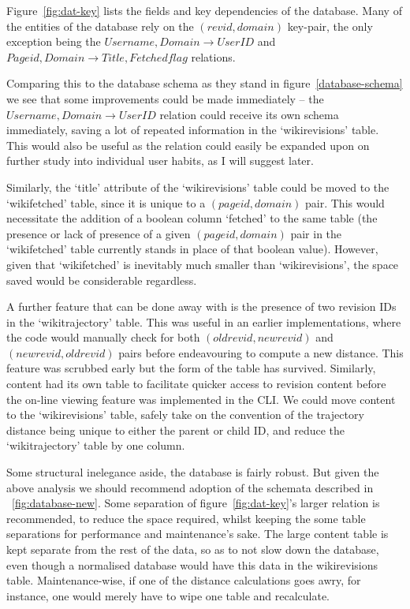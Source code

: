 Figure~\ref{fig:dat-key} lists the fields and key dependencies of the
database. Many of the entities of the database rely on the $(revid,
domain)$ key-pair, the only exception being the $Username, Domain
\rightarrow UserID$ and $Pageid, Domain \rightarrow Title, Fetched
flag$ relations.

Comparing this to the database schema as they stand in
figure~\ref{database-schema} we see that some improvements could be
made immediately -- the $Username, Domain \rightarrow UserID$ relation
could receive its own schema immediately, saving a lot of repeated
information in the `wikirevisions' table. This would also be useful as
the relation could easily be expanded upon on further study into
individual user habits, as I will suggest later.

Similarly, the `title' attribute of the `wikirevisions' table could be
moved to the `wikifetched' table, since it is unique to a
$(pageid,domain)$ pair. This would necessitate the addition of a
boolean column `fetched' to the same table (the presence or lack of
presence of a given $(pageid,domain)$ pair in the `wikifetched' table
currently stands in place of that boolean value). However, given that
`wikifetched' is inevitably much smaller than `wikirevisions', the
space saved would be considerable regardless.

A further feature that can be done away with is the presence of two
revision IDs in the `wikitrajectory' table. This was useful in an
earlier implementations, where the code would manually check for both
$(oldrevid,newrevid)$ and $(newrevid,oldrevid)$ pairs before
endeavouring to compute a new distance. This feature was scrubbed
early but the form of the table has survived. Similarly, content had
its own table to facilitate quicker access to revision content before
the on-line viewing feature was implemented in the CLI. We could move
content to the `wikirevisions' table, safely take on the convention of
the trajectory distance being unique to either the parent or child ID,
and reduce the `wikitrajectory' table by one column.

Some structural inelegance aside, the database is fairly robust. But
given the above analysis we should recommend adoption of the schemata
described in ~\ref{fig:database-new}. Some separation of
figure~\ref{fig:dat-key}'s larger relation is recommended, to reduce
the space required, whilst keeping the some table separations for
performance and maintenance's sake. The large content table is kept
separate from the rest of the data, so as to not slow down the
database, even though a normalised database would have this data in
the wikirevisions table. Maintenance-wise, if one of the distance
calculations goes awry, for instance, one would merely have to wipe
one table and recalculate.

